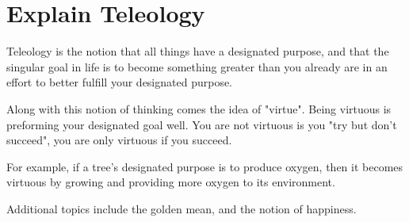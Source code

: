 \section{Explain Teleology}
Teleology is the notion that all things have a designated purpose, and that the
singular goal in life is to become something greater than you already are in an
effort to better fulfill your designated purpose.

Along with this notion of thinking comes the idea of "virtue". Being virtuous is
preforming your designated goal well. You are not virtuous is you "try but don't
succeed", you are only virtuous if you succeed.

For example, if a tree's designated purpose is to produce oxygen, then it
becomes virtuous by growing and providing more oxygen to its environment.

Additional topics include the golden mean, and the notion of happiness.
